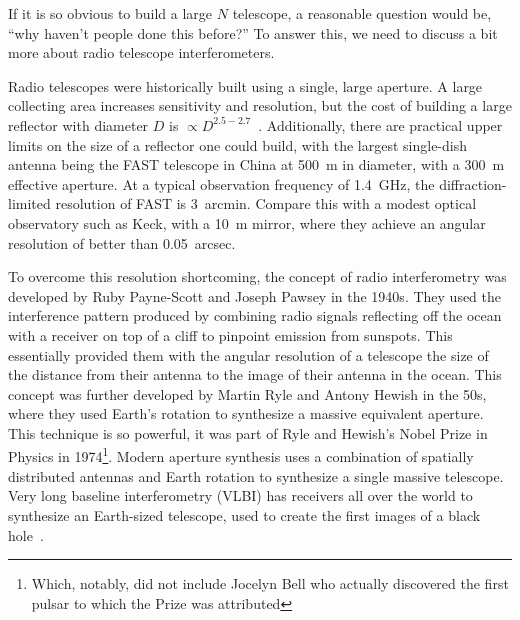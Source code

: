 If it is so obvious to build a large $N$ telescope, a reasonable question would be, “why haven't people done this before?”
To answer this, we need to discuss a bit more about radio telescope interferometers.

Radio telescopes were historically built using a single, large aperture.
A large collecting area increases sensitivity and resolution, but the cost of building a large reflector with diameter $D$ is $\propto D^{2.5-2.7}$~\cite{belleScalingRelationshipTelescope2004}.
Additionally, there are practical upper limits on the size of a reflector one could build, with the largest single-dish antenna being the FAST telescope in China at \qty{500}{\m} in diameter, with a \qty{300}{\m} effective aperture.
At a typical observation frequency of \qty{1.4}{\GHz}, the diffraction-limited resolution of FAST is \qty{3}{arcmin}.
Compare this with a modest optical observatory such as Keck, with a \qty{10}{\m} mirror, where they achieve an angular resolution of better than \qty{0.05}{arcsec}.

To overcome this resolution shortcoming, the concept of radio interferometry was developed by Ruby Payne-Scott and Joseph Pawsey in the 1940s.
They used the interference pattern produced by combining radio signals reflecting off the ocean with a receiver on top of a cliff to pinpoint emission from sunspots.
This essentially provided them with the angular resolution of a telescope the size of the distance from their antenna to the image of their antenna in the ocean.
This concept was further developed by Martin Ryle and Antony Hewish in the 50s, where they used Earth's rotation to synthesize a massive equivalent aperture.
This technique is so powerful, it was part of Ryle and Hewish's Nobel Prize in Physics in 1974\footnote{Which, notably, did not include Jocelyn Bell who actually discovered the first pulsar to which the Prize was attributed}.
Modern aperture synthesis uses a combination of spatially distributed antennas and Earth rotation to synthesize a single massive telescope.
Very long baseline interferometry (VLBI) has receivers all over the world to synthesize an Earth-sized telescope, used to create the first images of a black hole~\cite{eventhorizontelescopecollaborationFirstM87Event2019}.

